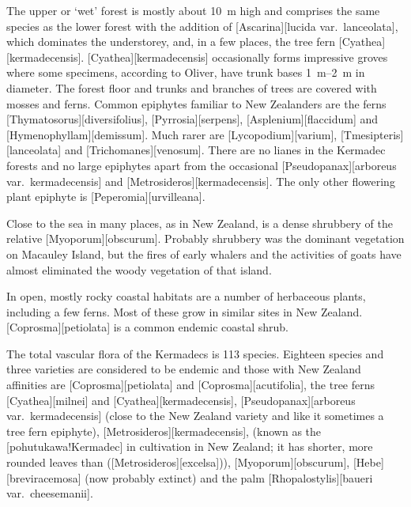 The upper or `wet' forest is mostly about \SI{10}{\metre} high and comprises the same species as the lower forest with the addition of [Ascarina][lucida var.\ lanceolata], which dominates the understorey, and, in a few places, the tree fern [Cyathea][kermadecensis]. [Cyathea][kermadecensis] occasionally forms impressive groves where some specimens, according to Oliver, have trunk bases \SIrange{1}{2}{\metre} in diameter.
The forest floor and trunks and branches of trees are covered with mosses and ferns.
Common epiphytes familiar to New Zealanders are the ferns [Thymatosorus][diversifolius], [Pyrrosia][serpens], [Asplenium][flaccidum] and [Hymenophyllam][demissum].
Much rarer are [Lycopodium][varium], [Tmesipteris][lanceolata] and [Trichomanes][venosum].
There are no lianes in the Kermadec forests and no large epiphytes apart from the occasional [Pseudopanax][arboreus var.\ kermadecensis] and [Metrosideros][kermadecensis].
The only other flowering plant epiphyte is [Peperomia][urvilleana].

Close to the sea in many places, as in New Zealand, is a dense shrubbery of the  relative [Myoporum][obscurum].
Probably  shrubbery was the dominant vegetation on Macauley Island, but the fires of early whalers and the activities of goats have almost eliminated the woody vegetation of that island.

In open, mostly rocky coastal habitats are a number of herbaceous plants, including a few ferns.
Most of these grow in similar sites in New Zealand. [Coprosma][petiolata] is a common endemic coastal shrub.

The total vascular flora of the Kermadecs is 113 species.
Eighteen species and three varieties are considered to be endemic and those with New Zealand affinities are [Coprosma][petiolata] and [Coprosma][acutifolia], the tree ferns [Cyathea][milnei] and [Cyathea][kermadecensis],  [Pseudopanax][arboreus var.\ kermadecensis] (close to the New Zealand variety and like it sometimes a tree fern epiphyte), [Metrosideros][kermadecensis], (known as the [pohutukawa!Kermadec] in cultivation in New Zealand; it has shorter, more rounded leaves than  ([Metrosideros][excelsa])), [Myoporum][obscurum], [Hebe][breviracemosa] (now probably extinct) and the palm [Rhopalostylis][baueri var.\ cheesemanii].

